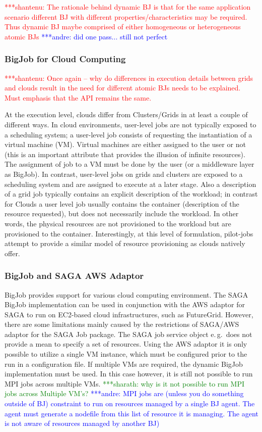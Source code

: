 \documentclass[conference,final]{IEEEtran}
\newcommand{\jhanote}[1]{ {\textcolor{red} { ***shantenu: #1 }}}
\newcommand{\alnote}[1]{ {\textcolor{blue} { ***andre: #1 }}}
\newcommand{\smnote}[1]{ {\textcolor{green} { ***sharath: #1 }}}
\newcommand{\alnote}[1]{}
\newcommand{\smnote}[1]{}
\newcommand{\jhanote}[1]{}
\begin{document}
\jhanote{The rationale behind dynamic BJ is that for the same
  application scenario different BJ with different
  properties/characteristics may be required. Thus dynamic BJ maybe
  comprised of either homogeneous or heterogeneous atomic BJs}
\alnote{did one pass... still not perfect}




\subsubsection{BigJob for Cloud Computing}

\jhanote{Once again -- why do differences in execution details between
  grids and clouds result in the need for different atomic BJs needs
  to be explained. Must emphasis that the API remains the same.}

At the execution level, clouds differ from Clusters/Grids in at least a couple
of different ways. In cloud environments, user-level jobs are not typically
exposed to a scheduling system; a user-level job consists of requesting the
instantiation of a virtual machine (VM). Virtual machines are either assigned to
the user or not (this is an important attribute that provides the illusion of
infinite resources). The assignment of job to a VM must be done by the user (or
a middleware layer as BigJob). In contrast, user-level jobs on grids and 
clusters are exposed to a scheduling system and are
assigned to execute at a later stage. Also a description of a grid job typically
contains an explicit description of the workload; in contrast for Clouds a user
level job usually contains the container (description of the resource
requested), but does not necessarily include the workload. In other words, the
physical resources are not provisioned to the workload but are provisioned to
the container.  Interestingly, at this level of formulation, pilot-jobs attempt 
to provide a similar model of resource provisioning as clouds natively offer. 

\subsubsection{BigJob and SAGA AWS Adaptor}

BigJob provides support for various cloud computing environment. The SAGA BigJob
implementation can be used in conjunction with the AWS adaptor for SAGA to run
on EC2-based cloud infrastructures, such as FutureGrid. However, there are some 
limitations mainly caused by the restrictions of SAGA/AWS adaptor for the SAGA 
Job package. The SAGA job service object e.\,g.\ does not provide a mean to 
specify a set of resources. Using the AWS adaptor it is only possible to utilize 
a single VM instance, which must be configured prior to the run in a 
configuration file. If multiple VMs are required, the dynamic BigJob 
implementation must be used. In this case however, it is still not possible to 
run MPI jobs across multiple VMs. 
\smnote {why is it not possible to run MPI jobs across Multiple VM's?} \alnote{MPI jobs are (unless you do something outside of BJ) constraint to run
on resources managed by a single BJ agent. The agent must generate a nodefile
from this list of resource it is managing. The agent is not aware of resources
managed by another BJ)}
\end{document}
